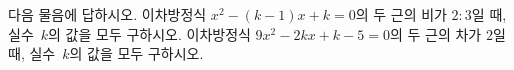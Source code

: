 다음 물음에 답하시오.
 이차방정식 $x^2-(k-1)x+k=0$의 두 근의 비가 $2:3$일 때, 실수~$k$의 값을 모두 구하시오.
 이차방정식 $9x^2-2kx+k-5=0$의 두 근의 차가 $2$일 때, 실수~$k$의 값을 모두 구하시오.
